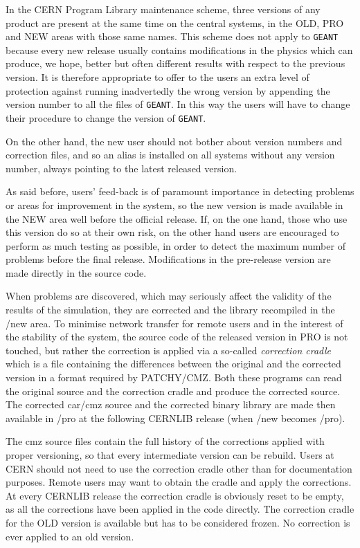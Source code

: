In the CERN Program Library maintenance scheme, three versions
of any product are present at the same time on the central systems,
in the
OLD, PRO and NEW areas with those same names. This scheme does not apply to
{\tt GEANT} because every new release usually contains modifications
in the physics which can produce, we hope,
better but often different results with
respect to the previous version. It is therefore appropriate to offer to
the users
an extra level of protection against running inadvertedly the wrong version
by appending the version number to all the files of {\tt GEANT}. In this way the
users will have to change their procedure to change the
version of {\tt GEANT}.
 
On the other hand, the new user should not bother about version numbers and
correction files, and so an alias is installed on all systems without any
version number, always pointing to the latest released version.
 
As said before, users' feed-back is of paramount importance in detecting
problems or areas for improvement in the system, so the new version is made
available in the NEW area well before the official
release. If, on the one hand, those who use this version do so
at their own risk, on the other hand users are encouraged to
perform
as much testing as possible, in order to detect the maximum
number of problems before the final release. Modifications in the pre-release
version are made directly in the source code.

When problems are discovered,
which may seriously affect the validity of the results of the simulation,
they are corrected and the library recompiled in the /new area.
To minimise network
transfer for remote users and in the interest of the stability of the system,
the source code of the released version in PRO is not touched, but rather
the correction is applied via a so-called {\it correction cradle} which is
a file containing the differences between the original and the corrected
version in a format required by PATCHY/CMZ. Both these programs can read the
original source and the correction cradle and produce the corrected source.
The corrected car/cmz source and the corrected binary library are made then
available in /pro at the following CERNLIB release (when /new becomes /pro).

The cmz source files contain the full history of the corrections applied
with proper versioning, so that every intermediate version can be rebuild.
Users at CERN should not need to use the correction                
cradle other than
for documentation purposes. Remote users may want to obtain
the cradle and apply the corrections.    
At every CERNLIB release the correction cradle 
is obviously reset to be empty, as all the
corrections have been applied in the code directly. The correction cradle for
the OLD version is available but has to be considered frozen.
No correction is ever applied to an old version.

